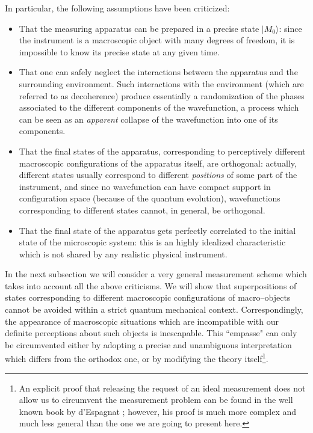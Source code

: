 \documentclass[12pt]{article}
\begin{document}
In particular, the following assumptions have been criticized:
\begin{itemize}
\item That the measuring apparatus can be prepared in a
precise state $|M_{0}\rangle$: since the instrument is a
macroscopic object with many degrees of freedom, it is impossible
to know its precise state at any given time.

\item That one can safely neglect the interactions between the
apparatus and the surrounding environment. Such interactions with
the environment (which are referred to as decoherence) produce
essentially a randomization of the phases associated to the
different components of the wavefunction, a process which can be
seen as an {\it apparent} collapse of the  wavefunction into one
of its components.

\item  That the final states of the apparatus, corresponding to
perceptively different macroscopic configurations of the apparatus
itself, are orthogonal: actually, different states usually
correspond to different {\it positions} of some part of the
instrument, and since no wavefunction can have compact support in
configuration space (because of the quantum evolution),
wavefunctions corresponding to different states cannot, in
general, be orthogonal.

\item That the final state of the apparatus gets perfectly
correlated to the initial state of the microscopic system: this is
an highly idealized characteristic which is not shared by any
realistic physical instrument.

\end{itemize}

In the next subsection we will consider a very general measurement
scheme \cite{bg1} which takes into account all the above
criticisms. We will show that superpositions of states
corresponding to different macroscopic configurations of
macro--objects cannot be avoided within a strict quantum
mechanical context. Correspondingly, the appearance of macroscopic
situations which are incompatible with our definite perceptions
about such objects is inescapable. This ``empasse" can only be
circumvented either by adopting a precise and unambiguous
interpretation which differs from the  orthodox one, or by
modifying the theory itself\footnote{An explicit  proof that
releasing the request of an ideal measurement does not allow us to
circumvent the measurement problem  can be found in the well known
book by d'Espagnat \cite{de}; however, his proof is much more
complex and much  less general than the one we are going to
present here.}.
\end{document}
